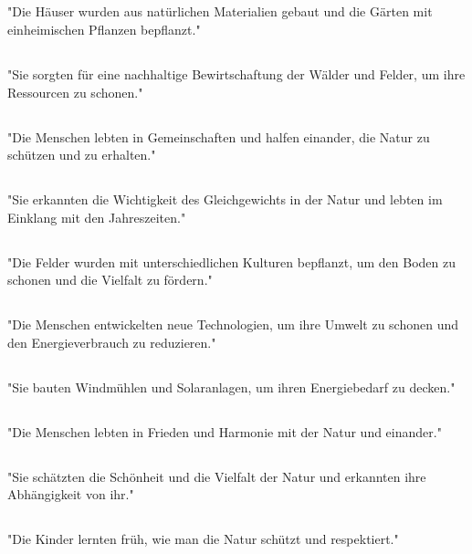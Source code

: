 \documentclass{article}
\begin{document}
\subsection{}
"Die Häuser wurden aus natürlichen Materialien gebaut und die Gärten mit einheimischen Pflanzen bepflanzt."
\subsection{}
"Sie sorgten für eine nachhaltige Bewirtschaftung der Wälder und Felder, um ihre Ressourcen zu schonen."
\subsection{}
"Die Menschen lebten in Gemeinschaften und halfen einander, die Natur zu schützen und zu erhalten."
\subsection{}
"Sie erkannten die Wichtigkeit des Gleichgewichts in der Natur und lebten im Einklang mit den Jahreszeiten."
\subsection{}
"Die Felder wurden mit unterschiedlichen Kulturen bepflanzt, um den Boden zu schonen und die Vielfalt zu fördern."
\subsection{}
"Die Menschen entwickelten neue Technologien, um ihre Umwelt zu schonen und den Energieverbrauch zu reduzieren."
\subsection{}
"Sie bauten Windmühlen und Solaranlagen, um ihren Energiebedarf zu decken."
\subsection{}
"Die Menschen lebten in Frieden und Harmonie mit der Natur und einander."
\subsection{}
"Sie schätzten die Schönheit und die Vielfalt der Natur und erkannten ihre Abhängigkeit von ihr."
\subsection{}
"Die Kinder lernten früh, wie man die Natur schützt und respektiert."
\end{document}
